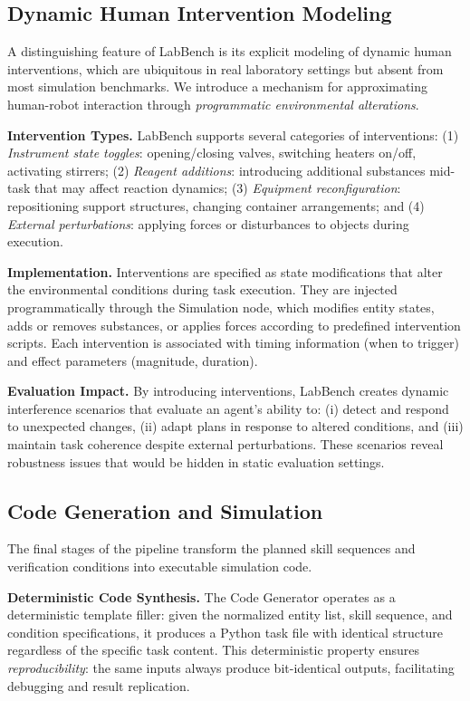 \documentclass[letterpaper]{article} %
\begin{document}
\subsection{Dynamic Human Intervention Modeling}

A distinguishing feature of LabBench is its explicit modeling of dynamic human interventions, which are ubiquitous in real laboratory settings but absent from most simulation benchmarks. We introduce a mechanism for approximating human-robot interaction through \textit{programmatic environmental alterations}.

\textbf{Intervention Types.} LabBench supports several categories of interventions: (1) \textit{Instrument state toggles}: opening/closing valves, switching heaters on/off, activating stirrers; (2) \textit{Reagent additions}: introducing additional substances mid-task that may affect reaction dynamics; (3) \textit{Equipment reconfiguration}: repositioning support structures, changing container arrangements; and (4) \textit{External perturbations}: applying forces or disturbances to objects during execution.

\textbf{Implementation.} Interventions are specified as state modifications that alter the environmental conditions during task execution. They are injected programmatically through the Simulation node, which modifies entity states, adds or removes substances, or applies forces according to predefined intervention scripts. Each intervention is associated with timing information (when to trigger) and effect parameters (magnitude, duration).

\textbf{Evaluation Impact.} By introducing interventions, LabBench creates dynamic interference scenarios that evaluate an agent's ability to: (i) detect and respond to unexpected changes, (ii) adapt plans in response to altered conditions, and (iii) maintain task coherence despite external perturbations. These scenarios reveal robustness issues that would be hidden in static evaluation settings.

\subsection{Code Generation and Simulation}

The final stages of the pipeline transform the planned skill sequences and verification conditions into executable simulation code.

\textbf{Deterministic Code Synthesis.} The Code Generator operates as a deterministic template filler: given the normalized entity list, skill sequence, and condition specifications, it produces a Python task file with identical structure regardless of the specific task content. This deterministic property ensures \textit{reproducibility}: the same inputs always produce bit-identical outputs, facilitating debugging and result replication.
\end{document}
